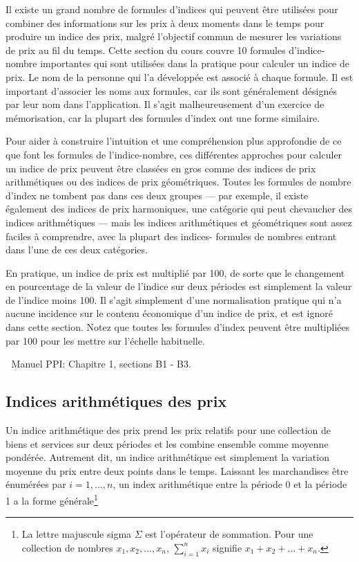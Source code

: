 \documentclass[
]{article}
\begin{document}
Il existe un grand nombre de formules d'indices qui peuvent être utilisées pour combiner des informations sur les prix à deux moments dans le temps pour produire un indice des prix, malgré l'objectif commun de mesurer les variations de prix au fil du temps. Cette section du cours couvre 10 formules d'indice-nombre importantes qui sont utilisées dans la pratique pour calculer un indice de prix. Le nom de la personne qui l'a développée est associé à chaque formule. Il est important d'associer les noms aux formules, car ils sont généralement désignés par leur nom dans l'application. Il s'agit malheureusement d'un exercice de mémorisation, car la plupart des formules d'index ont une forme similaire.

Pour aider à construire l'intuition et une compréhension plus approfondie de ce que font les formules de l'indice-nombre, ces différentes approches pour calculer un indice de prix peuvent être classées en gros comme des indices de prix arithmétiques ou des indices de prix géométriques. Toutes les formules de nombre d'index ne tombent pas dans ces deux groupes --- par exemple, il existe également des indices de prix harmoniques, une catégorie qui peut chevaucher des indices arithmétiques --- mais les indices arithmétiques et géométriques sont assez faciles à comprendre, avec la plupart des indices- formules de nombres entrant dans l'une de ces deux catégories.

En pratique, un indice de prix est multiplié par 100, de sorte que le changement en pourcentage de la valeur de l'indice sur deux périodes est simplement la valeur de l'indice moins 100. Il s'agit simplement d'une normalisation pratique qui n'a aucune incidence sur le contenu économique d'un indice de prix, et est ignoré dans cette section. Notez que toutes les formules d'index peuvent être multipliées par 100 pour les mettre sur l'échelle habituelle.

📖 Manuel PPI: Chapitre 1, sections B1 - B3.

\hypertarget{indices-arithmuxe9tiques-des-prix}{%
\subsection{Indices arithmétiques des prix}\label{indices-arithmuxe9tiques-des-prix}}

Un indice arithmétique des prix prend les prix relatifs pour une collection de biens et services sur deux périodes et les combine ensemble comme moyenne pondérée. Autrement dit, un indice arithmétique est simplement la variation moyenne du prix entre deux points dans le temps. Laissant les marchandises être énumérées par \(i = 1, \ldots, n\), un index arithmétique entre la période 0 et la période 1 a la forme générale\footnote{La lettre majuscule sigma \(\Sigma\) est l'opérateur de sommation. Pour une collection de nombres \(x_{1}, x_{2}, \ldots, x_{n}\), \(\sum_{i = 1}^{n} x_{i}\) signifie \(x_{1} + x_{2} + \ldots + x_{n}\).}
\end{document}
